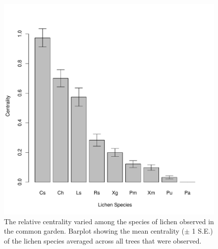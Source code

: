 \documentclass[11pt,onecolumn,lineno]{olplainarticle}
\begin{document}
\begin{figure}[ht]
\centering
\includegraphics[width=\linewidth]{figures/spp_cen.pdf}
\caption{The relative centrality varied among the species of lichen
  observed in the common garden. Barplot showing the mean centrality
  ($\pm$ 1 S.E.) of the lichen species averaged across all trees that
  were observed.}
\label{fig:spp_cen}
\end{figure}
\end{document}
